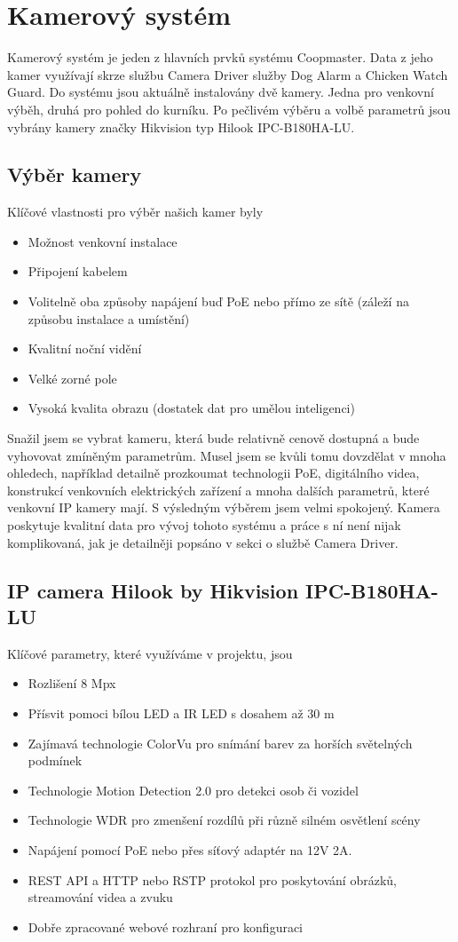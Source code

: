 \section{Kamerový systém}\label{sec:kamerovy-system}
Kamerový systém je jeden z hlavních prvků systému Coopmaster.
Data z jeho kamer využívají skrze službu Camera Driver služby Dog Alarm a Chicken Watch Guard.
Do systému jsou aktuálně instalovány dvě kamery. Jedna pro venkovní výběh, druhá pro pohled do kurníku.
Po pečlivém výběru a volbě parametrů jsou vybrány kamery značky Hikvision typ Hilook IPC-B180HA-LU.

\subsection*{Výběr kamery}
Klíčové vlastnosti pro výběr našich kamer byly
\begin{itemize}
    \item Možnost venkovní instalace
    \item Připojení kabelem
    \item Volitelně oba způsoby napájení buď PoE nebo přímo ze sítě (záleží na způsobu instalace a umístění)
    \item Kvalitní noční vidění
    \item Velké zorné pole
    \item Vysoká kvalita obrazu (dostatek dat pro umělou inteligenci)
\end{itemize}
Snažil jsem se vybrat kameru, která bude relativně cenově dostupná a bude vyhovovat zmíněným parametrům.
Musel jsem se kvůli tomu dovzdělat v mnoha ohledech, například detailně prozkoumat technologii PoE, digitálního videa, konstrukcí venkovních elektrických zařízení a mnoha dalších parametrů, které venkovní IP kamery mají.
S výsledným výběrem jsem velmi spokojený.
Kamera poskytuje kvalitní data pro vývoj tohoto systému a práce s ní není nijak komplikovaná, jak je detailněji popsáno v sekci o službě Camera Driver.

\subsection*{IP camera Hilook by Hikvision IPC-B180HA-LU}
Klíčové parametry, které využíváme v projektu, jsou
\begin{itemize}
    \item Rozlišení 8 Mpx
    \item Přísvit pomoci bílou LED a IR LED s dosahem až 30 m
    \item Zajímavá technologie ColorVu pro snímání barev za horších světelných podmínek
    \item Technologie Motion Detection 2.0 pro detekci osob či vozidel
    \item Technologie WDR pro zmenšení rozdílů při různě silném osvětlení scény
    \item Napájení pomocí PoE nebo přes síťový adaptér na 12V 2A.
    \item REST API a HTTP nebo RSTP protokol pro poskytování obrázků, streamování videa a zvuku
    \item Dobře zpracované webové rozhraní pro konfiguraci
\end{itemize}

%
%
%
